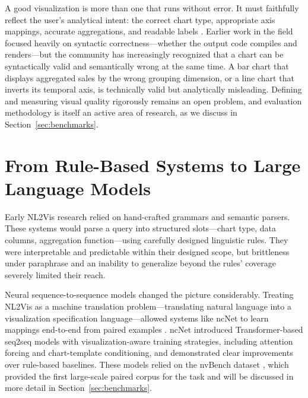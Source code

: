 \documentclass[a4paper,oneside,bibliography=totoc]{scrbook}
\begin{document}
A good visualization is more than one that runs without error. It must faithfully reflect the user's analytical intent: the correct chart type, appropriate axis mappings, accurate aggregations, and readable labels \cite{maddigan2023chat2vis}. Earlier work in the field focused heavily on syntactic correctness---whether the output code compiles and renders---but the community has increasingly recognized that a chart can be syntactically valid and semantically wrong at the same time. A bar chart that displays aggregated sales by the wrong grouping dimension, or a line chart that inverts its temporal axis, is technically valid but analytically misleading. Defining and measuring visual quality rigorously remains an open problem, and evaluation methodology is itself an active area of research, as we discuss in Section~\ref{sec:benchmarks}.

\section{From Rule-Based Systems to Large Language Models}
\label{sec:evolution}

Early NL2Vis research relied on hand-crafted grammars and semantic parsers. These systems would parse a query into structured slots---chart type, data columns, aggregation function---using carefully designed linguistic rules. They were interpretable and predictable within their designed scope, but brittleness under paraphrase and an inability to generalize beyond the rules' coverage severely limited their reach.

Neural sequence-to-sequence models changed the picture considerably. Treating NL2Vis as a machine translation problem---translating natural language into a visualization specification language---allowed systems like ncNet to learn mappings end-to-end from paired examples \cite{luo2022ncnet}. ncNet introduced Transformer-based seq2seq models with visualization-aware training strategies, including attention forcing and chart-template conditioning, and demonstrated clear improvements over rule-based baselines. These models relied on the nvBench dataset \cite{luo2021nvbench}, which provided the first large-scale paired corpus for the task and will be discussed in more detail in Section~\ref{sec:benchmarks}.
\end{document}
